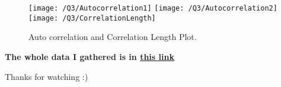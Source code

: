 \documentclass{article}
\begin{document}
    \begin{figure}[!htb]
        \centering
        \texttt{[image: /Q3/Autocorrelation1]}
        \label{fig:3.3}
        \texttt{[image: /Q3/Autocorrelation2]}
        \label{fig:3.4}
        \texttt{[image: /Q3/CorrelationLength]}
        \label{fig:3.5}
        \caption{Auto correlation and Correlation Length Plot.}
    \end{figure}

    \pagebreak

    \centering
    \textbf{The whole data I gathered is in \href{https://github.com/shahmari/ComputationalPhysics-Fall2021/tree/main/ProblemSet7/Data}{this link}}

    Thanks for watching :)
\end{document}

